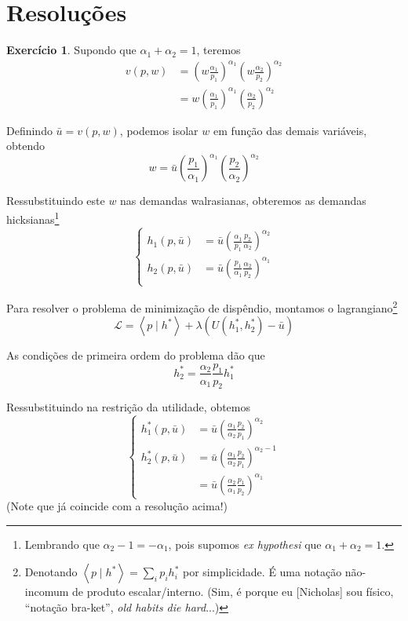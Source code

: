 \documentclass[12pt]{article}
\numberwithin{equation}{section}
\theoremstyle{plain}
\theoremstyle{definition}
\newtheorem{exercise}{Exercício}
\theoremstyle{remark}
\begin{document}
\section{Resoluções}
\setcounter{exercise}{0}

\begin{exercise}
  Supondo que $\alpha_1 + \alpha_2 = 1$, teremos
  \begin{align}
    v(p, w) &= \left(w \frac{\alpha_1}{p_1} \right)^{\alpha_1} \left(w \frac{\alpha_2}{p_2} \right)^{\alpha_2} \\
    &= w \left(\frac{\alpha_1}{p_1} \right)^{\alpha_1} \left(\frac{\alpha_2}{p_2} \right)^{\alpha_2}
  \end{align}
  
  Definindo $\bar{u} = v(p, w)$, podemos isolar $w$ em função das demais variáveis, obtendo
  \[
  w =\bar{u} \left(\frac{p_1}{\alpha_1}\right)^{\alpha_1} \left(\frac{p_2}{\alpha_2}\right)^{\alpha_2}  
  \]

  Ressubstituindo este $w$ nas demandas walrasianas, obteremos as demandas hicksianas\footnote{Lembrando que $\alpha_2 - 1  = - \alpha_1$, pois supomos \textit{ex hypothesi} que $\alpha_1 + \alpha_2 = 1$.}
  \[
  \begin{cases}
    h_1(p, \bar{u}) &= \bar{u} \left(\frac{\alpha_1}{p_1} \frac{p_2}{\alpha_2}\right)^{\alpha_2} \\
    h_2(p, \bar{u}) &= \bar{u} \left(\frac{p_1}{\alpha_1} \frac{\alpha_2}{p_2}\right)^{\alpha_1} \\
  \end{cases}
  \]

  Para resolver o problema de minimização de dispêndio, montamos o lagrangiano\footnote{Denotando $\left<p \mid h^*\right> = \sum\limits_i p_i h^*_i$ por simplicidade. É uma notação não-incomum de produto escalar/interno. (Sim, é porque eu [Nicholas] sou físico, ``notação bra-ket'', \textit{old habits die hard}...)}
  \[
  \mathcal{L} = \left<p \mid h^*\right> + \lambda (U(h^*_1, h^*_2) - \bar{u})
  \]

  As condições de primeira ordem do problema dão que
  \[
  h_2^* = \frac{\alpha_2}{\alpha_1} \frac{p_1}{p_2} h_1^*
  \]

  Ressubstituindo na restrição da utilidade, obtemos
  \[
  \begin{cases}
    h_{1}^*(p, \bar{u}) &= \bar{u} \left( \frac{\alpha_{1}}{\alpha_{2}} \frac{p_{2}}{p_{1}} \right)^{\alpha_{2}} \\
  h_{2}^*(p, \bar{u}) &= \bar{u} \left( \frac{\alpha_{1}}{\alpha_{2}} \frac{p_{2}}{p_{1}} \right)^{\alpha_{2}-1} \\
  &= \bar{u} \left( \frac{\alpha_{2}}{\alpha_{1}} \frac{p_{1}}{p_{2}} \right)^{\alpha_{1}}
  \end{cases}
  \]
  (Note que já coincide com a resolução acima!)


\end{exercise}
\end{document}
